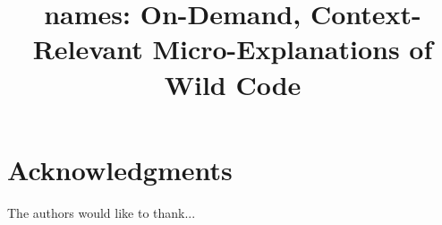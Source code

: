 \documentclass[conference]{IEEEtran}
\begin{document}
\title{\Glspl{name}: On-Demand, Context-Relevant Micro-Explanations of Wild Code}

\author{
\and
{}
}

\maketitle



\IEEEpeerreviewmaketitle









\section*{Acknowledgments}
The authors would like to thank...




\end{document}
